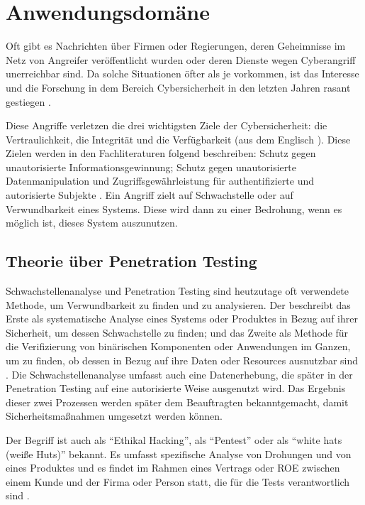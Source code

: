 \section{Anwendungsdomäne}

Oft gibt es Nachrichten über Firmen oder Regierungen, deren Geheimnisse im Netz von Angreifer veröffentlicht wurden oder deren Dienste wegen \gls{Cyberangriff} unerreichbar sind. Da solche Situationen öfter als je vorkommen, ist das Interesse und die Forschung in dem Bereich \gls{Cybersicherheit} in den letzten Jahren rasant gestiegen \citep{Tanembaum_MBS}. 

Diese Angriffe verletzen die drei wichtigsten Ziele der \gls{Cybersicherheit}: die Vertraulichkeit, die Integrität und die Verfügbarkeit (aus dem Englisch ). Diese Zielen werden in den Fachliteraturen folgend beschreiben: Schutz gegen unautorisierte Informationsgewinnung; Schutz gegen unautorisierte Datenmanipulation und Zugriffsgewährleistung für authentifizierte und autorisierte Subjekte \citep{Wendzel_It-Sicherheit}. Ein Angriff zielt auf \gls{Schwachstelle} oder auf \gls{Verwundbarkeit} eines Systems. Diese wird dann zu einer Bedrohung, wenn es möglich ist, dieses System auszunutzen.

\subsection{Theorie über Penetration Testing}

Schwachstellenanalyse und Penetration Testing sind heutzutage oft verwendete Methode, um \gls{Verwundbarkeit} zu finden und zu analysieren. Der  beschreibt das Erste als systematische Analyse eines Systems oder Produktes in Bezug auf ihrer Sicherheit, um dessen \gls{Schwachstelle} zu finden; und das Zweite als Methode für die Verifizierung von binärischen Komponenten oder Anwendungen im Ganzen, um zu finden, ob dessen  in Bezug auf ihre Daten oder Resources ausnutzbar sind \citep{NIST_Definitionen}. Die Schwachstellenanalyse umfasst auch eine Datenerhebung, die später in der Penetration Testing auf eine autorisierte Weise ausgenutzt wird\citep{Goel_VulAsses_PenTest}. Das Ergebnis dieser zwei Prozessen werden später dem Beauftragten bekanntgemacht, damit Sicherheitsmaßnahmen umgesetzt werden können.

Der Begriff ist auch als ``Ethikal Hacking'', als ``Pentest'' oder als ``white hats (weiße Huts)'' bekannt. Es umfasst spezifische Analyse von Drohungen und von  eines Produktes und es findet im Rahmen eines Vertrags oder \gls{ROE} zwischen einem Kunde und der Firma oder Person statt, die für die Tests verantwortlich sind \citep{Bishop_PenTest}.

